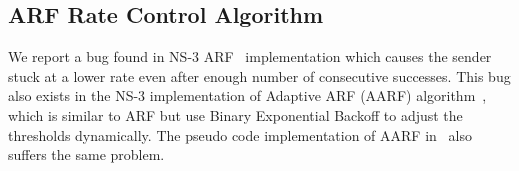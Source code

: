 \subsection{ARF Rate Control Algorithm}
\label{subsec:arf}

We report a bug found in NS-3 ARF~\cite{kamerman1997wavelan} implementation
which causes the sender stuck at a lower rate even after enough number of
consecutive successes. This bug also exists in the NS-3 implementation of
Adaptive ARF (AARF) algorithm~\cite{lacage2004ieee}, which is similar to ARF but
use Binary Exponential Backoff to adjust the thresholds dynamically. The pseudo
code implementation of AARF in~\cite{lacage2004report} also suffers the same
problem.
